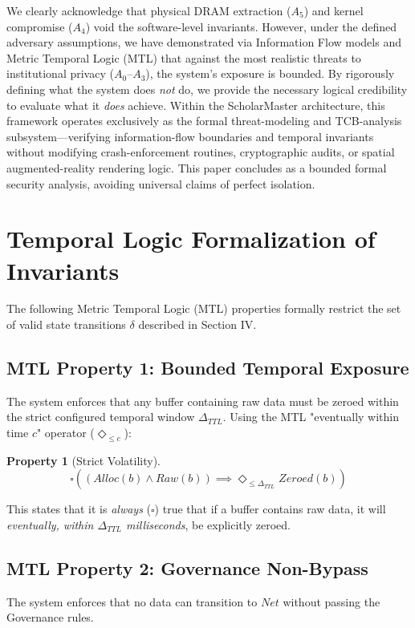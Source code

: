 \documentclass[conference]{IEEEtran}
\newtheorem{property}{Property}
\begin{document}
We clearly acknowledge that physical DRAM extraction ($A_5$) and kernel compromise ($A_4$) void the software-level invariants. However, under the defined adversary assumptions, we have demonstrated via Information Flow models and Metric Temporal Logic (MTL) that against the most realistic threats to institutional privacy ($A_0$--$A_3$), the system's exposure is bounded. By rigorously defining what the system does \textit{not} do, we provide the necessary logical credibility to evaluate what it \textit{does} achieve. Within the ScholarMaster architecture, this framework operates exclusively as the formal threat-modeling and TCB-analysis subsystem---verifying information-flow boundaries and temporal invariants without modifying crash-enforcement routines, cryptographic audits, or spatial augmented-reality rendering logic. This paper concludes as a bounded formal security analysis, avoiding universal claims of perfect isolation.

\appendices

\section{Temporal Logic Formalization of Invariants}
The following Metric Temporal Logic (MTL) properties formally restrict the set of valid state transitions $\delta$ described in Section IV. 

\subsection{MTL Property 1: Bounded Temporal Exposure}
The system enforces that any buffer containing raw data must be zeroed within the strict configured temporal window $\Delta_{TTL}$. Using the MTL "eventually within time $c$" operator ($\Diamond_{\le c}$):

\begin{property}[Strict Volatility]
\begin{equation}
\square \left( (Alloc(b) \land Raw(b)) \implies \Diamond_{\le \Delta_{TTL}} Zeroed(b) \right)
\end{equation}
\end{property}
This states that it is \textit{always} ($\square$) true that if a buffer contains raw data, it will \textit{eventually, within $\Delta_{TTL}$ milliseconds}, be explicitly zeroed.

\subsection{MTL Property 2: Governance Non-Bypass}
The system enforces that no data can transition to $Net$ without passing the Governance rules.
\end{document}
